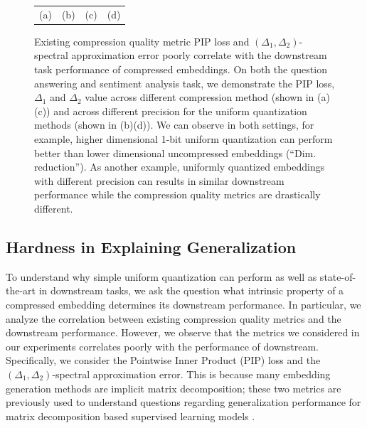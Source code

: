 \begin{figure}
\begin{tabular}{c c c c}
		(a) & (b) & (c) & (d) 
	\end{tabular}
	\caption{Existing compression quality metric PIP loss and $(\Delta_1, \Delta_2)$-spectral approximation error poorly correlate with the downstream task performance of compressed embeddings.  On both the question answering and sentiment analysis task, we demonstrate the PIP loss, $\Delta_1$ and $\Delta_2$ value across different compression method (shown in (a)(c)) and across different precision for the uniform quantization methods (shown in (b)(d)). We can observe in both settings, for example, higher dimensional 1-bit uniform quantization can perform better than lower dimensional uncompressed embeddings (``Dim. reduction''). As another example, uniformly quantized embeddings with different precision can results in similar downstream performance while the compression quality metrics are drastically different.}
	\label{fig:bad_correlation}
\end{figure}


\subsection{Hardness in Explaining Generalization}
\label{subsec:hard_explain}
To understand why simple uniform quantization can perform as well as state-of-the-art in downstream tasks, we ask the question what intrinsic property of a compressed embedding determines its downstream performance. In particular, we analyze the correlation between existing compression quality metrics and the downstream performance. However, we observe that the metrics we considered in our experiments correlates poorly with the performance of downstream.
Specifically, we consider the Pointwise Inner Product (PIP) loss and the $(\Delta_1, \Delta_2)$-spectral approximation error. This is because many embedding generation methods are implicit matrix decomposition; these two metrics are previously used to understand questions regarding generalization performance for matrix decomposition based supervised learning models \citep{avron17,yin18,lprff18}. 

